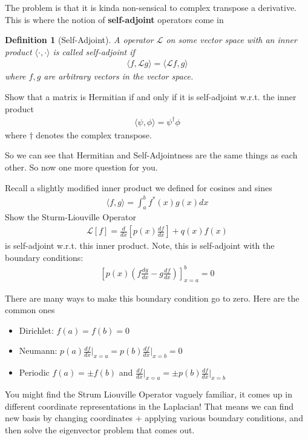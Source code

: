 \documentclass[12pt,fleqn]{article}
\numberwithin{equation}{section} %
\newtheorem{definition}{Definition}
\newcounter{problem}
\begin{document}
The problem is that it is kinda non-sensical to complex transpose a derivative. This is where the notion of \textbf{self-adjoint} operators come in
\begin{definition}
	[Self-Adjoint] A operator $\mathcal L$ on some vector space with an inner product $\langle \cdot, \cdot \rangle$ is called self-adjoint if
	\begin{align}
		\langle f, \mathcal L g\rangle = \langle \mathcal L f , g\rangle
	\end{align}
	where $f,g$ are arbitrary vectors in the vector space.
\end{definition} 
\begin{problem}
	Show that a matrix is Hermitian if and only if it is self-adjoint w.r.t. the inner product
	\begin{align}
		\langle \psi, \phi\rangle = \psi^\dagger \phi
	\end{align}
	where $\dagger$ denotes the complex transpose.
\end{problem}
So we can see that Hermitian and Self-Adjointness are the same things as each other. So now one more question for you.
\begin{problem}
	Recall a slightly modified inner product we defined for cosines and sines
	\begin{align}
		\langle f, g \rangle = \int_a^b f^*(x) g(x) dx
	\end{align}
	Show the Sturm-Liouville Operator 
	\begin{align}
		\mathcal L[f] = \frac{d}{dx} \left[ p(x) \frac{df}{dx} \right] + q(x) f(x)
	\end{align}
	is self-adjoint w.r.t. this inner product. Note, this is self-adjoint with the boundary conditions:
	\begin{align}
		\left[p(x) \left(f \frac{dg}{dx} - g \frac{df}{dx}\right) \right]_{x=a}^b = 0
	\end{align}
\end{problem}
There are many ways to make this boundary condition go to zero. Here are the common ones
\begin{itemize}
	\item Dirichlet: $f(a) = f(b) = 0$
	\item Neumann: $p(a) \frac{df}{dx} \Big|_{x=a} = p(b) \frac{df}{dx} \Big|_{x=b} = 0$
	\item Periodic $f(a) = \pm f(b)$ and $\frac{df}{dx} \Big|_{x=a} = \pm p(b) \frac{df}{dx} \Big|_{x=b}$
\end{itemize}
You might find the Strum Liouville Operator vaguely familiar, it comes up in different coordinate representations in the Laplacian! That means we can find new basis by changing coordinates + applying various boundary conditions, and then solve the eigenvector problem that comes out.
\end{document}
